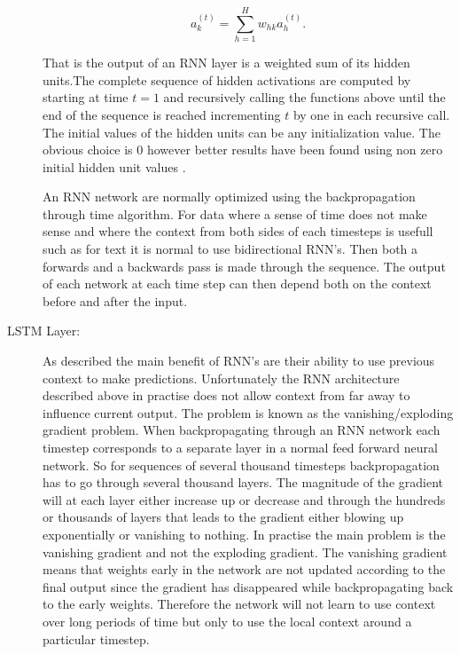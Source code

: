 \begin{description}
        \begin{equation}
            a^{(t)}_k = \sum_{h=1}^H w_{hk} a_{h}^{(t)}.
        \end{equation}

        That is the output of an \gls{RNN} layer is a weighted sum of its
        hidden units.The complete sequence of hidden activations are computed
        by starting at time $t=1$ and recursively calling the functions above
        until the end of the sequence is reached incrementing $t$ by one in
        each recursive call. The initial values of the hidden units can be
        any initialization value. The obvious choice is 0 however better
        results have been found using non zero initial hidden unit values
        \citep{DBLP:series/sci/2012-385}.

        An \gls{RNN} network are normally optimized using the backpropagation
        through time algorithm. For data where a sense of time does not make
        sense and where the context from both sides of each timesteps is usefull
        such as for text it is normal to use bidirectional \gls{RNN}'s. Then
        both a forwards and a backwards pass is made through the sequence. The
        output of each network at each time step can then depend both on the
        context before and after the input.

    \item[\gls{LSTM} Layer:]
        \label{layer:LSTM}

        As described the main benefit of \gls{RNN}'s are their ability to use
        previous context to make predictions. Unfortunately the \gls{RNN}
        architecture described above in practise does not allow context from
        far away to influence current output. The problem is known as the
        vanishing/exploding gradient problem. When backpropagating through an
        \gls{RNN} network each timestep corresponds to a separate layer in a
        normal feed forward neural network. So for sequences of several thousand
        timesteps backpropagation has to go through several thousand layers.
        The magnitude of the gradient will at each layer either increase up or
        decrease and through the hundreds or thousands of layers that leads to
        the gradient either blowing up exponentially or vanishing to nothing.
        In practise the main problem is the vanishing gradient and not the
        exploding gradient. The vanishing gradient means that weights early
        in the network are not updated according to the final output since
        the gradient has disappeared while backpropagating back to the early
        weights. Therefore the network will not learn to use context over long
        periods of time but only to use the local context around a particular
        timestep.


\end{description}
